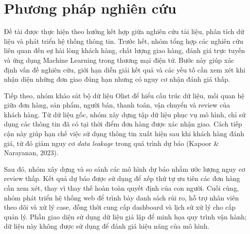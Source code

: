 \section{Phương pháp nghiên cứu}
\label{sec:phuong-phap-nghien-cuu}

Đề tài được thực hiện theo hướng kết hợp giữa nghiên cứu tài liệu, phân tích dữ liệu và phát triển hệ thống thông tin. Trước hết, nhóm tổng hợp các nghiên cứu liên quan đến sự hài lòng khách hàng, chất lượng giao hàng, đánh giá trực tuyến và ứng dụng Machine Learning trong thương mại điện tử. Bước này giúp xác định vấn đề nghiên cứu, giới hạn diễn giải kết quả và các yếu tố cần xem xét khi nhận diện những đơn giao đúng hạn nhưng có nguy cơ nhận đánh giá thấp.

Tiếp theo, nhóm khảo sát bộ dữ liệu Olist để hiểu cấu trúc dữ liệu, mối quan hệ giữa đơn hàng, sản phẩm, người bán, thanh toán, vận chuyển và review của khách hàng. Từ dữ liệu gốc, nhóm xây dựng tập dữ liệu phục vụ mô hình, chỉ sử dụng các thông tin đã có tại thời điểm đơn hàng được xác nhận giao. Cách tiếp cận này giúp hạn chế việc sử dụng thông tin xuất hiện sau khi khách hàng đánh giá, từ đó giảm nguy cơ \emph{data leakage} trong quá trình dự báo (Kapoor \& Narayanan, 2023).

Sau đó, nhóm xây dựng và so sánh các mô hình dự báo nhằm ước lượng nguy cơ review thấp. Kết quả dự báo được sử dụng để xếp thứ tự ưu tiên các đơn hàng cần xem xét, thay vì thay thế hoàn toàn quyết định của con người. Cuối cùng, nhóm phát triển hệ thống web để trình bày danh sách rủi ro, hỗ trợ nhân viên theo dõi và xử lý case, đồng thời cung cấp dashboard và lịch sử xử lý cho cấp quản lý. Phần giao diện sử dụng dữ liệu giả lập để minh họa quy trình vận hành; dữ liệu này không được sử dụng để đánh giá hiệu năng của mô hình.
